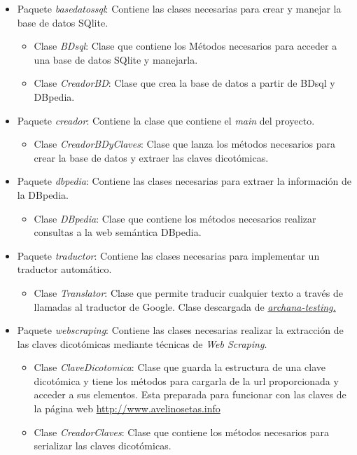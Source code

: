 \begin{itemize}
	\item Paquete \textit{basedatossql}: Contiene las clases necesarias para crear y manejar la base de datos SQlite.
	\begin{itemize}
		\item Clase \textit{BDsql}: Clase que contiene los Métodos necesarios para acceder a una base de datos SQlite y manejarla.
		\item Clase \textit{CreadorBD}: Clase que crea la base de datos a partir de BDsql y DBpedia.
	\end{itemize}
	\item Paquete \textit{creador}: Contiene la clase que contiene el \textit{main} del proyecto.
	\begin{itemize}
		\item Clase \textit{CreadorBDyClaves}: Clase que lanza los métodos necesarios para crear la base de datos y extraer las claves dicotómicas.
	\end{itemize}
	\item Paquete \textit{dbpedia}: Contiene las clases necesarias para extraer la información de la DBpedia.
	\begin{itemize}
		\item Clase \textit{DBpedia}: Clase que contiene los métodos necesarios realizar consultas a la web semántica DBpedia.
	\end{itemize}
	\item Paquete \textit{traductor}: Contiene las clases necesarias para implementar un traductor automático.
	\begin{itemize}
		\item Clase \textit{Translator}: Clase que permite traducir cualquier texto a través de llamadas al traductor de Google. Clase descargada de \href{http://archana-testing.blogspot.com.es/2016/02/calling-google-translation-api-in-java.html}{\textit{archana-testing.}}
	\end{itemize}
	\item Paquete \textit{webscraping}: Contiene las clases necesarias realizar la extracción de las claves dicotómicas mediante técnicas de \textit{Web Scraping}.
	\begin{itemize}
		\item Clase \textit{ClaveDicotomica}: Clase que guarda la estructura de una clave dicotómica y tiene los métodos para cargarla de la url proporcionada y acceder a sus elementos. Esta preparada para funcionar con las claves de la página web \url{http://www.avelinosetas.info}
		\item Clase \textit{CreadorClaves}: Clase que contiene los métodos necesarios para serializar las claves dicotómicas.
	\end{itemize}
\end{itemize}
